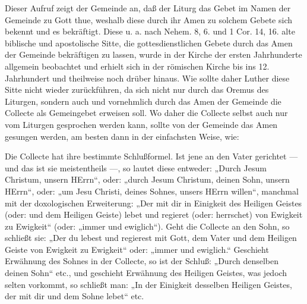 
Dieser Aufruf zeigt der Gemeinde an, daß der Liturg das Gebet im Namen der Gemeinde zu Gott thue, weshalb diese durch ihr Amen zu solchem Gebete sich bekennt und es bekräftigt. Diese u. a. nach Nehem. 8, 6. und 1 Cor. 14, 16. alte biblische und apostolische Sitte, die gottesdienstlichen Gebete durch das Amen der Gemeinde bekräftigen zu lassen, wurde in der Kirche der ersten Jahrhunderte allgemein beobachtet und erhielt sich in der römischen Kirche bis ins 12. Jahrhundert und theilweise noch drüber hinaus. Wie sollte daher Luther diese Sitte nicht wieder zurückführen, da sich nicht nur durch das Oremus des Liturgen, sondern auch und vornehmlich durch das Amen der Gemeinde die Collecte als Gemeingebet erweisen soll. Wo daher die Collecte selbst auch nur vom Liturgen gesprochen werden kann, sollte von der Gemeinde das Amen gesungen werden, am besten dann in der einfachsten Weise, wie:


Die Collecte hat ihre bestimmte Schlußformel. Ist jene an den Vater gerichtet — und das ist sie meistentheils —, so lautet diese entweder: „Durch Jesum Christum, unsern HErrn“, oder: „durch Jesum Christum, deinen Sohn, unsern HErrn“, oder: „um Jesu Christi, deines Sohnes, unsers HErrn willen“, manchmal mit der doxologischen Erweiterung: „Der mit dir in Einigkeit des Heiligen Geistes (oder: und dem Heiligen Geiste) lebet und regieret (oder: herrschet) von Ewigkeit zu Ewigkeit“ (oder: „immer und ewiglich“). Geht die Collecte an den Sohn, so schließt sie: „Der du lebest und regierest mit Gott, dem Vater und dem Heiligen Geiste von Ewigkeit zu Ewigkeit“ oder: „immer und ewiglich.“ Geschieht Erwähnung des Sohnes in der Collecte, so ist der Schluß: „Durch denselben deinen Sohn“ etc., und geschieht Erwähnung des Heiligen Geistes, was jedoch selten vorkommt, so schließt man: „In der Einigkeit desselben Heiligen Geistes, der mit dir und dem Sohne lebet“ etc.

